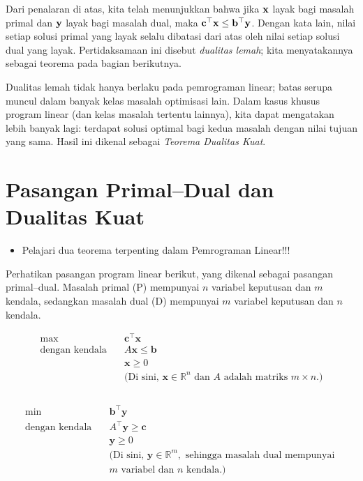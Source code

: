 Dari penalaran di atas, kita telah menunjukkan bahwa jika $\mathbf{x}$ layak bagi masalah primal dan $\mathbf{y}$ layak bagi masalah dual, maka $\mathbf{c}^\top \mathbf{x} \leq \mathbf{b}^\top \mathbf{y}$. Dengan kata lain, nilai setiap solusi primal yang layak selalu dibatasi dari atas oleh nilai setiap solusi dual yang layak. Pertidaksamaan ini disebut \emph{dualitas lemah}; kita menyatakannya sebagai teorema pada bagian berikutnya.

Dualitas lemah tidak hanya berlaku pada pemrograman linear; batas serupa muncul dalam banyak kelas masalah optimisasi lain. Dalam kasus khusus program linear (dan kelas masalah tertentu lainnya), kita dapat mengatakan lebih banyak lagi: terdapat solusi optimal bagi kedua masalah dengan nilai tujuan yang sama. Hasil ini dikenal sebagai \emph{Teorema Dualitas Kuat}.

\section{Pasangan Primal--Dual dan Dualitas Kuat}
\label{sec:duality-strong}
\begin{outcome}
\begin{itemize}
\item Pelajari dua teorema terpenting dalam Pemrograman Linear!!!
\end{itemize}
\end{outcome}
Perhatikan pasangan program linear berikut, yang dikenal sebagai pasangan primal--dual. Masalah primal (P) mempunyai $n$ variabel keputusan dan $m$ kendala, sedangkan masalah dual (D) mempunyai $m$ variabel keputusan dan $n$ kendala.
\par\noindent
\begin{tcolorbox}[title=Primal (P), colback=blue!5, colframe=blue!60!black, sharp corners=south]
\[
\begin{aligned}
\max\ & \mathbf{c}^\top \mathbf{x} \\
\text{dengan kendala} \quad & A \mathbf{x} \leq \mathbf{b} \\
& \mathbf{x} \geq 0 \\
& \text{(Di sini, } \mathbf{x} \in \mathbb{R}^n \text{ dan } A \text{ adalah matriks } m \times n\text{.)}
\\
\phantom{} \\
\end{aligned}
\]
\end{tcolorbox}

\medskip

\begin{tcolorbox}[title=Dual (D), colback=green!5, colframe=green!60!black, sharp corners=south]
\[
\begin{aligned}
\min\ & \mathbf{b}^\top \mathbf{y} \\
\text{dengan kendala} \quad & A^\top \mathbf{y} \geq \mathbf{c} \\
& \mathbf{y} \geq 0 \\
& \text{(Di sini, } \mathbf{y} \in \mathbb{R}^m, \text{ sehingga masalah dual mempunyai } \\
& m \text{ variabel dan } n \text{ kendala.)}
\end{aligned}
\]
\end{tcolorbox}
\par


